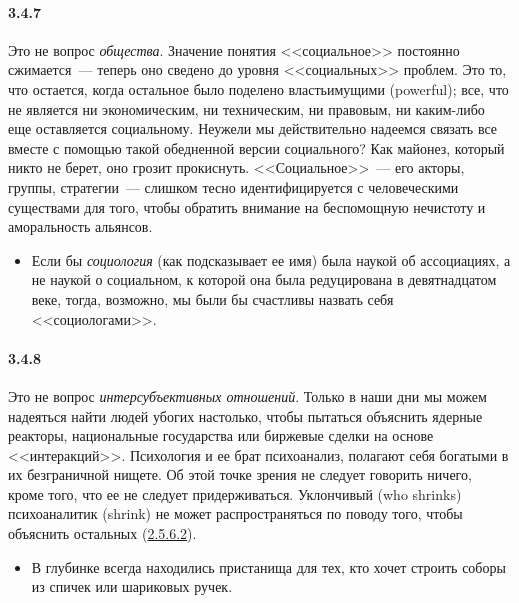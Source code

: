 \paragraph{3.4.7}\hypertarget{par:3.4.7}{} Это не вопрос {\itshape общества}. Значение понятия <<социальное>> постоянно сжимается~--- теперь оно сведено до уровня <<социальных>> проблем. Это то, что остается, когда остальное было поделено властьимущими (powerful); все, что не является ни экономическим, ни техническим, ни правовым, ни каким-либо еще оставляется социальному. Неужели мы действительно надеемся связать все вместе с помощью такой обедненной версии социального? Как майонез, который никто не берет, оно грозит прокиснуть. <<Социальное>>~--- его акторы, группы, стратегии~--- слишком тесно идентифицируется с человеческими существами для того, чтобы обратить внимание на беспомощную нечистоту и аморальность альянсов.
	\begin{itemize}
	\item 
	Если бы {\itshape социология} (как подсказывает ее имя) была наукой об ассоциациях, а не наукой о социальном, к которой она была редуцирована в девятнадцатом веке, тогда, возможно, мы были бы счастливы назвать себя <<социологами>>.
	\end{itemize}

\paragraph{3.4.8}\hypertarget{par:3.4.8}{} Это не вопрос {\itshape интерсубъективных отношений}. Только в наши дни мы можем надеяться найти людей убогих настолько, чтобы пытаться объяснить ядерные реакторы, национальные государства или биржевые сделки на основе <<интеракций>>. Психология и ее брат психоанализ, полагают себя богатыми в их безграничной нищете. Об этой точке зрения не следует говорить ничего, кроме того, что ее не следует придерживаться. Уклончивый (who shrinks) психоаналитик (shrink) не может распространяться по поводу того, чтобы объяснить остальных (\hyperlink{par:2.5.6.2}{2.5.6.2}).
	\begin{itemize}
	\item 
	В глубинке всегда находились пристанища для тех, кто хочет строить соборы из спичек или шариковых ручек.
	\end{itemize}

